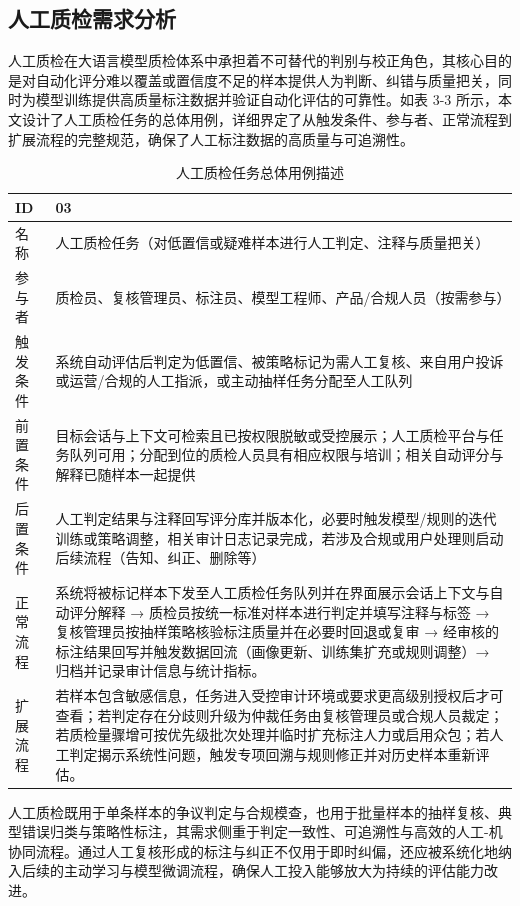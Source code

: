 \subsection{人工质检需求分析}
人工质检在大语言模型质检体系中承担着不可替代的判别与校正角色，其核心目的是对自动化评分难以覆盖或置信度不足的样本提供人为判断、纠错与质量把关，同时为模型训练提供高质量标注数据并验证自动化评估的可靠性。如表 3-3 所示，本文设计了人工质检任务的总体用例，详细界定了从触发条件、参与者、正常流程到扩展流程的完整规范，确保了人工标注数据的高质量与可追溯性。
\begin{table}[htb]
\centering
\caption{人工质检任务总体用例描述}
\label{tab:human_qc_usecase}
{\renewcommand{\arraystretch}{1.2}
\begin{tabular}{p{3cm} p{10cm}}
\hline
ID & 03 \\
\hline
名称 & 人工质检任务（对低置信或疑难样本进行人工判定、注释与质量把关） \\
\hline
参与者 & 质检员、复核管理员、标注员、模型工程师、产品/合规人员（按需参与） \\
\hline
触发条件 & 系统自动评估后判定为低置信、被策略标记为需人工复核、来自用户投诉或运营/合规的人工指派，或主动抽样任务分配至人工队列 \\
\hline
前置条件 & 目标会话与上下文可检索且已按权限脱敏或受控展示；人工质检平台与任务队列可用；分配到位的质检人员具有相应权限与培训；相关自动评分与解释已随样本一起提供 \\
\hline
后置条件 & 人工判定结果与注释回写评分库并版本化，必要时触发模型/规则的迭代训练或策略调整，相关审计日志记录完成，若涉及合规或用户处理则启动后续流程（告知、纠正、删除等） \\
\hline
正常流程 & 系统将被标记样本下发至人工质检任务队列并在界面展示会话上下文与自动评分解释 → 质检员按统一标准对样本进行判定并填写注释与标签 → 复核管理员按抽样策略核验标注质量并在必要时回退或复审 → 经审核的标注结果回写并触发数据回流（画像更新、训练集扩充或规则调整）→ 归档并记录审计信息与统计指标。 \\
\hline
扩展流程 & 若样本包含敏感信息，任务进入受控审计环境或要求更高级别授权后才可查看；若判定存在分歧则升级为仲裁任务由复核管理员或合规人员裁定；若质检量骤增可按优先级批次处理并临时扩充标注人力或启用众包；若人工判定揭示系统性问题，触发专项回溯与规则修正并对历史样本重新评估。 \\
\hline
\end{tabular}
}
\end{table}

人工质检既用于单条样本的争议判定与合规模查，也用于批量样本的抽样复核、典型错误归类与策略性标注，其需求侧重于判定一致性、可追溯性与高效的人工-机协同流程。通过人工复核形成的标注与纠正不仅用于即时纠偏，还应被系统化地纳入后续的主动学习与模型微调流程，确保人工投入能够放大为持续的评估能力改进。

